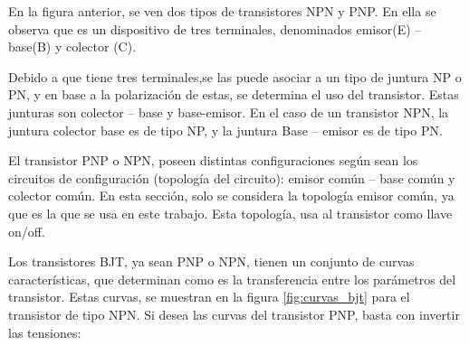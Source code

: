 En la figura anterior, se ven dos tipos de transistores NPN y PNP. En ella se observa que es un dispositivo de tres terminales, denominados emisor(E) – base(B) y colector (C).  

Debido a que tiene tres terminales,se las puede asociar a un tipo de juntura NP o PN, y en base a la polarización de estas, se  determina el uso del transistor. Estas junturas son colector – base y base-emisor. En el caso de un transistor NPN, la juntura colector base es de tipo NP, y la juntura Base – emisor es de tipo PN. 

El transistor PNP o NPN, poseen distintas configuraciones según sean los circuitos de configuración (topología del circuito): emisor común – base común y colector común. En esta sección, solo se considera la topología emisor común, ya que es la que se usa en este trabajo. Esta topología, usa al transistor como llave on/off.  

Los transistores BJT, ya sean PNP o NPN, tienen un conjunto de curvas características, que determinan como es la transferencia entre los parámetros del transistor. Estas curvas, se muestran en la figura \ref{fig:curvas_bjt} para el transistor de tipo NPN. Si desea las curvas del transistor PNP, basta con invertir las tensiones: 

